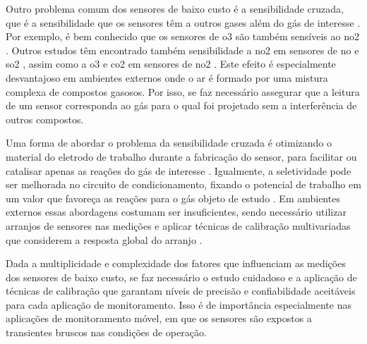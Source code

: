 Outro problema comum dos sensores de baixo custo é a sensibilidade cruzada, que é a sensibilidade que os sensores têm a outros gases além do gás de interesse \cite{Maag2018ADeployments}. Por exemplo, é bem conhecido que os sensores de \acrshort{o3} são também sensíveis ao \acrshort{no2} \cite{Pang2017ElectrochemicalMonitoring,Alphasense2019AlphasenseSensors}. Outros estudos têm encontrado também sensibilidade a \acrshort{no2} em sensores de \acrshort{no} e \acrshort{so2} \cite{Lewis2016EvaluatingResearch}, assim como a \acrshort{o3} e \acrshort{co2} em sensores de \acrshort{no2} \cite{Lewis2018Low-costApplications}. Este efeito é especialmente desvantajoso em ambientes externos onde o ar é formado por uma mistura complexa de compostos gasosos. Por isso, se faz necessário assegurar que a leitura de um sensor corresponda ao gás para o qual foi projetado sem a interferência de outros compostos.

Uma forma de abordar o problema da sensibilidade cruzada é otimizando o material do eletrodo de trabalho durante a fabricação do sensor, para facilitar ou catalisar apenas as reações do gás de interesse \cite{R.Stetter2008AmperometricReview}. Igualmente, a seletividade pode ser melhorada no circuito de condicionamento, fixando o potencial de trabalho em um valor que favoreça as reações para o gás objeto de estudo \cite{R.Stetter2008AmperometricReview,Alphasense2013AlphasenseWork}. Em ambientes externos essas abordagens costumam ser insuficientes, sendo necessário utilizar arranjos de sensores nas medições e aplicar técnicas de calibração multivariadas que considerem a resposta global do arranjo \cite{Maag2018ADeployments}.

Dada a multiplicidade e complexidade dos fatores que influenciam as medições dos sensores de baixo custo, se faz necessário o estudo cuidadoso e a aplicação de técnicas de calibração que garantam níveis de precisão e confiabilidade aceitáveis para cada aplicação de monitoramento. Isso é de importância especialmente nas aplicações de monitoramento móvel, em que os sensores são expostos a transientes bruscos nas condições de operação.

